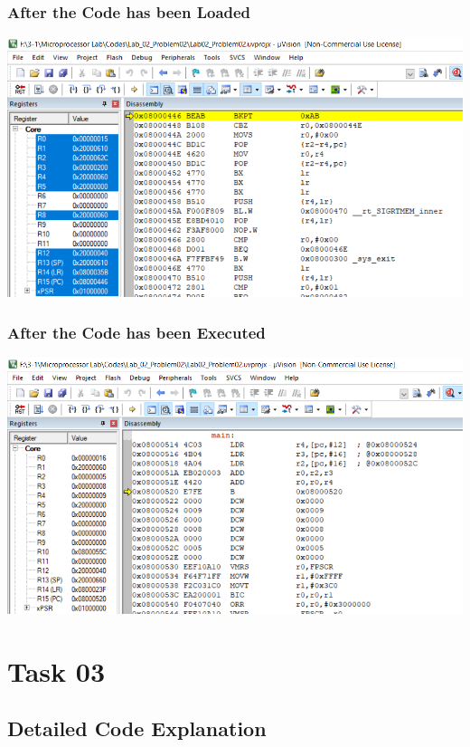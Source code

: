 \documentclass{article}
\begin{document}
\subsubsection{After the Code has been Loaded}
\begin{center}
    \includegraphics[width=1.1\textwidth]{problem02_01.png}
\end{center}

\subsubsection{After the Code has been Executed}
\begin{center}
    \includegraphics[width=1.1\textwidth]{problem02_02.png}
\end{center}

\section{Task 03}

\subsection{Detailed Code Explanation}
\end{document}
